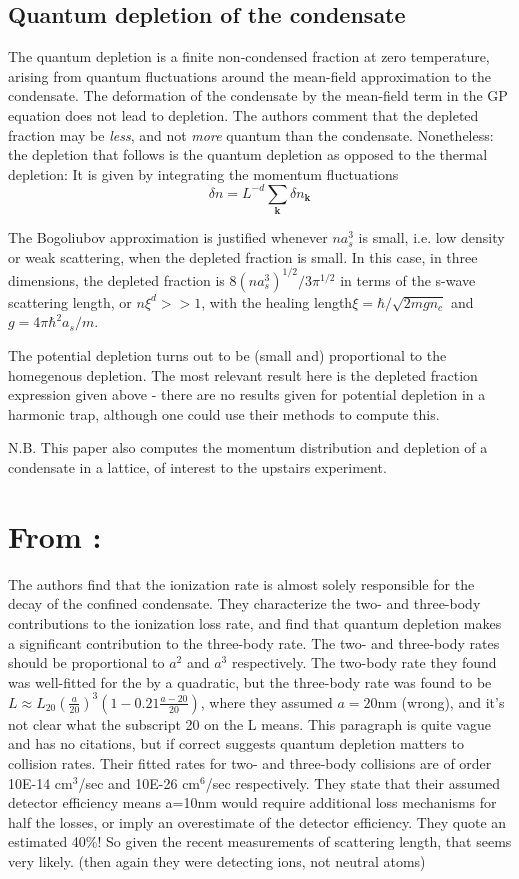 \documentclass{article}
\begin{document}
\subsection{Quantum depletion of the condensate}
The quantum depletion is a finite non-condensed fraction at zero temperature, arising from quantum fluctuations around the mean-field approximation to the condensate. The deformation of the condensate by the mean-field term in the GP equation does not lead to depletion. The authors comment that the depleted fraction may be \emph{less}, and not \emph{more} quantum than the condensate. Nonetheless: the depletion that follows is the quantum depletion as opposed to the thermal depletion: It is given by integrating the momentum fluctuations
$$\delta n = L^{-d} \sum_{\textbf{k}} \delta n_{\textbf{k}}$$

The Bogoliubov approximation is justified whenever $n a_{s}^3$ is small, i.e. low density or weak scattering, when the depleted fraction is small.  In this case, in three dimensions, the depleted fraction is $8(n a_s ^3)^{1/2} / 3 \pi^{1/2}$ in terms of the s-wave scattering length, or $n\xi^d >>1$, with the healing length$\xi = \hbar/\sqrt{2mgn_c}$ and $g=4\pi \hbar^2 a_s/m$.

The potential depletion turns out to be (small and) proportional to the homegenous depletion. The most relevant result here is the depleted fraction expression given above - there are no results given for potential depletion in a harmonic trap, although one could use their methods to compute this. 

N.B. This paper also computes the momentum distribution and depletion of a condensate in a lattice, of interest to the upstairs experiment. 

\section{From \cite{Sirjean}:}
The authors find that the ionization rate is almost solely responsible for the decay of the confined condensate. They characterize the two- and three-body contributions to the ionization loss rate, and find that quantum depletion makes a significant contribution to the three-body rate. The two- and three-body rates should be proportional to $a^2$ and $a^3$ respectively. The two-body rate they found was well-fitted for the by a quadratic, but the three-body rate was found to be $L\approx L_{20} (\frac{a}{20})^3 (1-0.21\frac{a-20}{20})$, where they assumed $a=20$nm (wrong), and it's not clear what the subscript 20 on the L means. This paragraph is quite vague and has no citations, but if correct suggests quantum depletion matters to collision rates. Their fitted rates for two- and three-body collisions are of order 10E-14 cm$^3$/sec and 10E-26 cm$^6$/sec respectively. They state that their assumed detector efficiency means a=10nm would require additional loss mechanisms for half the losses, or imply an overestimate of the detector efficiency. They quote an estimated 40\%! So given the recent measurements of scattering length, that seems very likely. (then again they were detecting ions, not neutral atoms)
\end{document}
